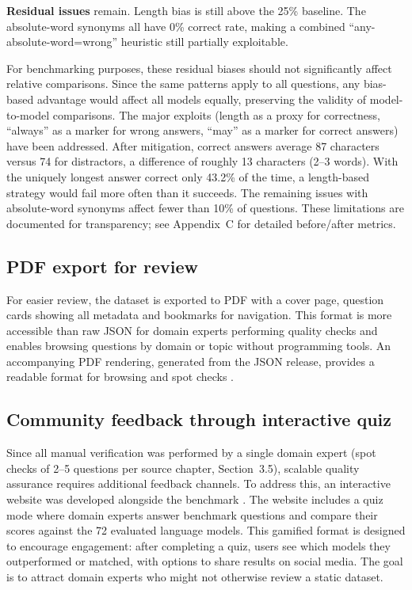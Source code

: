 \documentclass[11pt]{article}
\begin{document}
\textbf{Residual issues} remain. Length bias is still above the 25\% baseline. The absolute-word synonyms all have 0\% correct rate, making a combined ``any-absolute-word=wrong'' heuristic still partially exploitable.

For benchmarking purposes, these residual biases should not significantly affect relative comparisons. Since the same patterns apply to all questions, any bias-based advantage would affect all models equally, preserving the validity of model-to-model comparisons. The major exploits (length as a proxy for correctness, ``always'' as a marker for wrong answers, ``may'' as a marker for correct answers) have been addressed. After mitigation, correct answers average 87 characters versus 74 for distractors, a difference of roughly 13 characters (2--3 words). With the uniquely longest answer correct only 43.2\% of the time, a length-based strategy would fail more often than it succeeds. The remaining issues with absolute-word synonyms affect fewer than 10\% of questions. These limitations are documented for transparency; see Appendix~C for detailed before/after metrics.


\subsection{PDF export for review}

For easier review, the dataset is exported to PDF with a cover page, question cards showing all metadata and bookmarks for navigation. This format is more accessible than raw JSON for domain experts performing quality checks and enables browsing questions by domain or topic without programming tools.
An accompanying PDF rendering, generated from the JSON release, provides a readable format for browsing and spot checks \cite{formationeval_dataset,formationeval_pdf}.


\subsection{Community feedback through interactive quiz}

Since all manual verification was performed by a single domain expert (spot checks of 2--5 questions per source chapter, Section~3.5), scalable quality assurance requires additional feedback channels. To address this, an interactive website was developed alongside the benchmark \cite{formationeval_website}. The website includes a quiz mode where domain experts answer benchmark questions and compare their scores against the 72 evaluated language models. This gamified format is designed to encourage engagement: after completing a quiz, users see which models they outperformed or matched, with options to share results on social media. The goal is to attract domain experts who might not otherwise review a static dataset.
\end{document}
